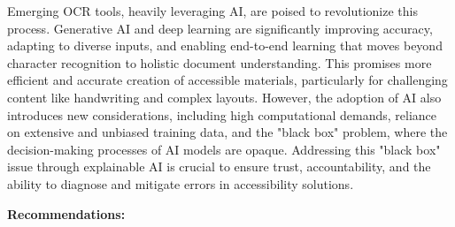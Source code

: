 Emerging OCR tools, heavily leveraging AI, are poised to revolutionize this process. Generative AI and deep learning are significantly improving accuracy, adapting to diverse inputs, and enabling end-to-end learning that moves beyond character recognition to holistic document understanding. This promises more efficient and accurate creation of accessible materials, particularly for challenging content like handwriting and complex layouts. However, the adoption of AI also introduces new considerations, including high computational demands, reliance on extensive and unbiased training data, and the "black box" problem, where the decision-making processes of AI models are opaque. Addressing this "black box" issue through explainable AI is crucial to ensure trust, accountability, and the ability to diagnose and mitigate errors in accessibility solutions.

\textbf{Recommendations:}

